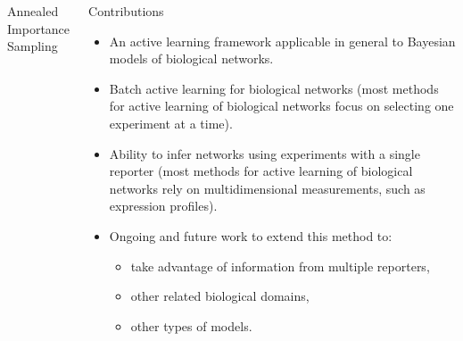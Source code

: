 \documentclass[final,handout]{beamer}
\begin{document}
\begin{frame}{}
\begin{columns}[T]
\begin{block}{Annealed Importance Sampling \strut}
{
}
\end{block}


\column{17em}
\begin{block}{Contributions\strut}
\begin{itemize}
\item An active learning framework applicable in general to Bayesian models of biological networks.
\item Batch active learning for biological networks (most  methods for active learning of biological networks focus on selecting one experiment at a time).
\item Ability to infer networks using experiments with a single reporter (most methods for active learning of biological networks rely on multidimensional measurements, such as expression profiles).
\item Ongoing and future work to extend this method to:
\begin{itemize}
 \item take advantage of information from multiple reporters,
 \item other related biological domains,
 \item other types of models.
\end{itemize}
\end{itemize}
\end{block}

\end{columns}

\end{frame}
\end{document}
